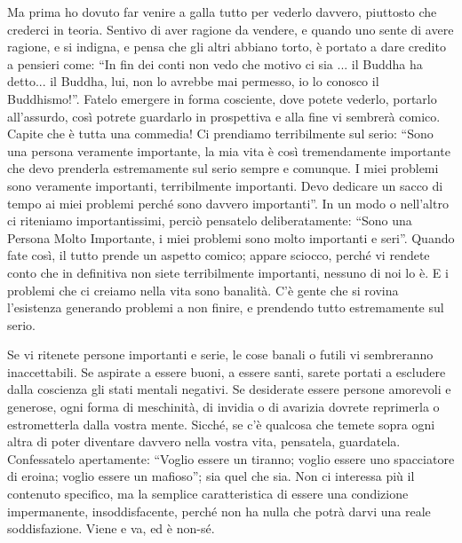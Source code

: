 Ma prima ho dovuto far venire a galla tutto per vederlo davvero,
piuttosto che crederci in teoria. Sentivo di aver ragione da vendere, e
quando uno sente di avere ragione, e si indigna, e pensa che gli altri
abbiano torto, è portato a dare credito a pensieri come: ``In fin dei
conti non vedo che motivo ci sia ... il Buddha ha detto... il Buddha,
lui, non lo avrebbe mai permesso, io lo conosco il Buddhismo!''. Fatelo
emergere in forma cosciente, dove potete vederlo, portarlo all'assurdo,
così potrete guardarlo in prospettiva e alla fine vi sembrerà comico.
Capite che è tutta una commedia! Ci prendiamo terribilmente sul serio:
``Sono una persona veramente importante, la mia vita è così tremendamente
importante che devo prenderla estremamente sul serio sempre e comunque.
I miei problemi sono veramente importanti, terribilmente importanti.
Devo dedicare un sacco di tempo ai miei problemi perché sono davvero
importanti''. In un modo o nell'altro ci riteniamo importantissimi,
perciò pensatelo deliberatamente: ``Sono una Persona Molto Importante, i
miei problemi sono molto importanti e seri''. Quando fate così, il tutto
prende un aspetto comico; appare sciocco, perché vi rendete conto che in
definitiva non siete terribilmente importanti, nessuno di noi lo è. E i
problemi che ci creiamo nella vita sono banalità. C'è gente che si
rovina l'esistenza generando problemi a non finire, e prendendo tutto
estremamente sul serio.

Se vi ritenete persone importanti e serie, le cose banali o futili vi
sembreranno inaccettabili. Se aspirate a essere buoni, a essere santi,
sarete portati a escludere dalla coscienza gli stati mentali negativi.
Se desiderate essere persone amorevoli e generose, ogni forma di
meschinità, di invidia o di avarizia dovrete reprimerla o estrometterla
dalla vostra mente. Sicché, se c'è qualcosa che temete sopra ogni altra
di poter diventare davvero nella vostra vita, pensatela, guardatela.
Confessatelo apertamente: ``Voglio essere un tiranno; voglio essere uno
spacciatore di eroina; voglio essere un mafioso''; sia quel che sia. Non
ci interessa più il contenuto specifico, ma la semplice caratteristica
di essere una condizione impermanente, insoddisfacente, perché non ha
nulla che potrà darvi una reale soddisfazione. Viene e va, ed è non-sé.
